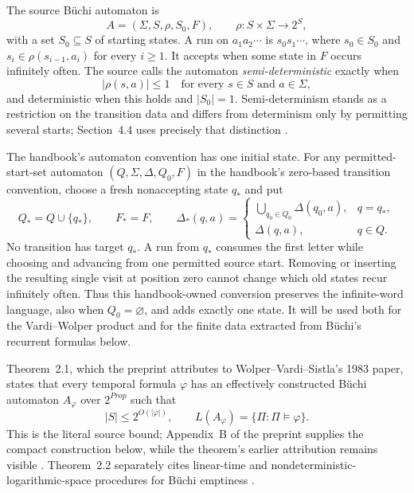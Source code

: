 The source B\"uchi automaton is
\[
 A=(\Sigma,S,\rho,S_0,F),
 \qquad
 \rho:S\times\Sigma\longrightarrow 2^S,
\]
with a set \(S_0\subseteq S\) of starting states.  A run on
\(a_1a_2\cdots\) is \(s_0s_1\cdots\), where
\(s_0\in S_0\) and \(s_i\in\rho(s_{i-1},a_i)\) for every \(i\ge1\).
It accepts when some state in \(F\) occurs infinitely often.  The source calls
the automaton \emph{semi-deterministic} exactly when
\[
 |\rho(s,a)|\le1
 \quad\text{for every }s\in S\text{ and }a\in\Sigma,
\]
and deterministic when this holds and \(|S_0|=1\).  Semi-determinism stands
as a restriction on the transition data and differs from determinism only by
permitting several starts; Section~4.4 uses precisely that distinction
\cite[preprint pp.~4 and 10 and app.~A]{VardiWolper1986}.

The handbook's automaton convention has one initial state.  For any
permitted-start-set automaton \((Q,\Sigma,\Delta,Q_0,F)\) in the handbook's
zero-based transition convention, choose a fresh nonaccepting state \(q_*\) and
put
\[
 Q_*=Q\cup\{q_*\},
 \qquad
 F_*=F,
 \qquad
 \Delta_*(q,a)=
 \begin{cases}
  \displaystyle\bigcup_{q_0\in Q_0}\Delta(q_0,a),&q=q_*,\\
  \Delta(q,a),&q\in Q.
 \end{cases}
\]
No transition has target \(q_*\).  A run from \(q_*\) consumes the first
letter while choosing and advancing from one permitted source start.  Removing
or inserting the resulting single visit at position zero cannot change which
old states recur infinitely often.  Thus this handbook-owned conversion
preserves the infinite-word language, also when \(Q_0=\varnothing\), and adds
exactly one state.  It will be used both for the Vardi--Wolper product and for
the finite data extracted from B\"uchi's recurrent formulas below.

Theorem~2.1, which the preprint attributes to Wolper--Vardi--Sistla's 1983
paper, states that every temporal formula \(\varphi\) has an effectively
constructed B\"uchi automaton \(A_\varphi\) over
\(2^{\mathit{Prop}}\) such that
\[
 |S|\le2^{O(|\varphi|)},
 \qquad
 L(A_\varphi)=\{\Pi:\Pi\models\varphi\}.
\]
This is the literal source bound; Appendix~B of the preprint supplies the
compact construction below, while the theorem's earlier attribution remains
visible \cite{WolperVardiSistla1983,VardiWolper1986}.  Theorem~2.2 separately cites linear-time
and nondeterministic-logarithmic-space procedures for B\"uchi emptiness
\cite[preprint p.~4]{VardiWolper1986}.

